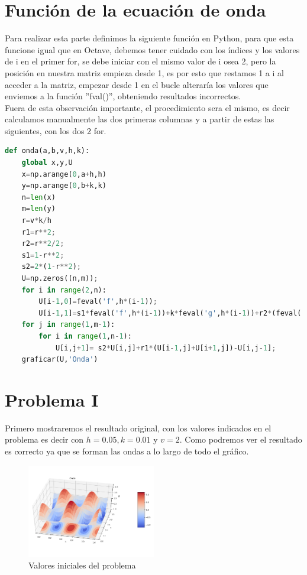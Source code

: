 \documentclass[letterpaper, 12 pt, conference]{ieeeconf}
\begin{document}
\section{Función de la ecuación de onda}
Para realizar esta parte definimos la siguiente función en Python, para que esta funcione igual que en Octave, debemos tener cuidado con los índices y los valores de i en el primer for, se debe iniciar con el mismo valor de i osea 2, pero la posición en nuestra matriz empieza desde 1, es por esto que restamos 1 a i al acceder a la matriz, empezar desde 1 en el bucle alteraría los valores que enviemos a la función ''fval()'', obteniendo resultados incorrectos.\\
Fuera de esta observación importante, el procedimiento sera el mismo, es decir calculamos manualmente las dos primeras columnas y a partir de estas las siguientes, con los dos 2 for.
\begin{lstlisting}[language=Python,caption=Ecuación de onda]
def onda(a,b,v,h,k):
    global x,y,U
    x=np.arange(0,a+h,h)
    y=np.arange(0,b+k,k)
    n=len(x)
    m=len(y)
    r=v*k/h
    r1=r**2;
    r2=r**2/2;
    s1=1-r**2;
    s2=2*(1-r**2);
    U=np.zeros((n,m));
    for i in range(2,n):
        U[i-1,0]=feval('f',h*(i-1));
        U[i-1,1]=s1*feval('f',h*(i-1))+k*feval('g',h*(i-1))+r2*(feval('f',h*i)+feval('f',h*(i-2)));
    for j in range(1,m-1):
        for i in range(1,n-1):
            U[i,j+1]= s2*U[i,j]+r1*(U[i-1,j]+U[i+1,j])-U[i,j-1];
    graficar(U,'Onda')
\end{lstlisting}
\section{Problema I}
Primero mostraremos el resultado original, con los valores indicados en el problema es decir con $h=0.05, k=0.01$ y $v=2$. Como podremos ver el resultado es correcto ya que se forman las ondas a lo largo de todo el gráfico.
\begin{figure}[H]
    \centering
    \includegraphics[width=0.5\textwidth]{h 0.05 k 0.01.png}
    \caption{Valores iniciales del problema}
\end{figure}
\end{document}
